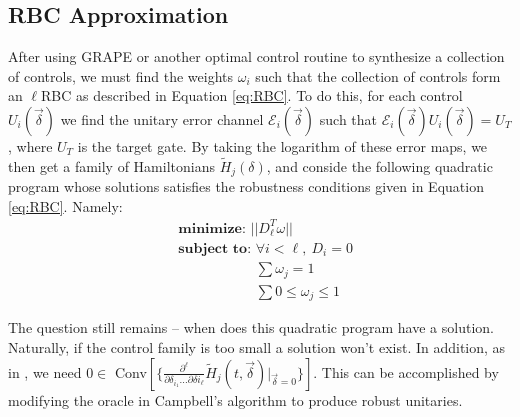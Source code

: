 \documentclass[aps,nofootinbib,pra,notitlepage,twocolumn]{revtex4-1}
\begin{document}
\subsection{RBC Approximation}
After using GRAPE or another optimal control routine to synthesize a collection of controls, we must find the weights $\omega_i$ such that the collection of controls form an $\ell$RBC as described in Equation \ref{eq:RBC}. To do this, for each control $U_i(\vec{\delta})$ we find the unitary error channel $\mathcal{E}_i(\vec{\delta})$ such that $\mathcal{E}_i(\vec{\delta})U_i(\vec{\delta})=U_T$, where $U_T$ is the target gate. By taking the logarithm of these error maps, we then get a family of Hamiltonians $\tilde{H}_j(\delta)$, and conside the following quadratic program whose solutions satisfies the robustness conditions given in Equation \ref{eq:RBC}. Namely:
\begin{equation}\label{eq:minimization}
  \begin{split}
    &\textbf{minimize: } ||D_{\ell}^T\omega||\\
    &\textbf{subject to: } \forall i<\ell,\ D_i=0\\
   	&\phantom{\textbf{subject to: }}\sum \omega_j = 1\\
   	&\phantom{\textbf{subject to: }}\sum 0 \le \omega_j \le 1    
  \end{split}
\end{equation}

The question still remains -- when does this quadratic program have a solution. Naturally, if the control family is too small a solution won't exist. In addition, as in \cite{Campbell2017}, we need  $0\in $ Conv$[\{\frac{\partial^{\ell}}{\partial\delta_{i_1}...\partial\delta{i_\ell}}\tilde{H}_j(t,\vec{\delta})|_{\vec{\delta}=0}\}]$. This can be accomplished by modifying the oracle in Campbell's algorithm to produce robust unitaries.

\end{document}

